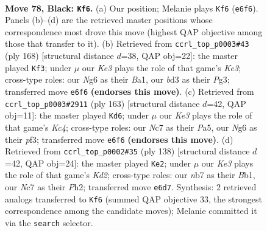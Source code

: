 \documentclass[11pt]{article}
\begin{document}
\clearpage

\begin{figure}[p]\centering
\begin{subfigure}{0.46\textwidth}\centering
\resizebox{\linewidth}{!}{%
\newchessgame
\chessboard[
  setfen={8/1Nn5/4k1n1/p7/Pb1pP3/1P1B3p/4P3/3K4 b - - 23 78},
  showmover=false,
  pgfstyle=straightmove, color=movearrow, markmove={e6-f6}
]}
\caption{}
\end{subfigure}\hfill
\begin{subfigure}{0.46\textwidth}\centering
\resizebox{\linewidth}{!}{%
\newchessgame
\chessboard[
  setfen={6k1/1B3p2/Pb4p1/2p1P2p/2b4P/4K1P1/8/B7 w - - 45 85},
  showmover=false,
  pgfstyle=straightmove, color=movearrow, markmove={e3-f3}
]}
\caption{}
\end{subfigure}
\\[4pt]
\begin{subfigure}{0.46\textwidth}\centering
\resizebox{\linewidth}{!}{%
\newchessgame
\chessboard[
  setfen={8/8/8/p1kPp1p1/7p/1B2PP1P/P3K3/2b5 b - - 81 82},
  showmover=false,
  pgfstyle=straightmove, color=movearrow, markmove={c5-d6}
]}
\caption{}
\end{subfigure}\hfill
\begin{subfigure}{0.46\textwidth}\centering
\resizebox{\linewidth}{!}{%
\newchessgame
\chessboard[
  setfen={R7/8/5k2/2n2p2/3bp1p1/6P1/1p1K1P1P/1B6 w - - 18 70},
  showmover=false,
  pgfstyle=straightmove, color=movearrow, markmove={d2-e2}
]}
\caption{}
\end{subfigure}
\caption{\textbf{Move 78, Black: \texttt{Kf6}.} (a) Our position; Melanie plays \texttt{Kf6} (\texttt{e6f6}). Panels (b)--(d) are the retrieved master positions whose correspondence most drove this move (highest QAP objective among those that transfer to it). (b) Retrieved from \texttt{ccrl\_top\_p0003\#43} (ply 168) [structural distance $d$=38, QAP obj=22]: the master played \texttt{Kf3}; under $\mu$ our \emph{Ke3} plays the role of that game's \emph{Ke3}; cross-type roles: our \emph{N}g6 as their \emph{B}a1, our \emph{b}d3 as their \emph{P}g3; transferred move \texttt{e6f6} \textbf{(endorses this move)}. (c) Retrieved from \texttt{ccrl\_top\_p0003\#2911} (ply 163) [structural distance $d$=42, QAP obj=11]: the master played \texttt{Kd6}; under $\mu$ our \emph{Ke3} plays the role of that game's \emph{Kc4}; cross-type roles: our \emph{N}c7 as their \emph{P}a5, our \emph{N}g6 as their \emph{p}f3; transferred move \texttt{e6f6} \textbf{(endorses this move)}. (d) Retrieved from \texttt{ccrl\_top\_p0002\#35} (ply 138) [structural distance $d$=42, QAP obj=24]: the master played \texttt{Ke2}; under $\mu$ our \emph{Ke3} plays the role of that game's \emph{Kd2}; cross-type roles: our \emph{n}b7 as their \emph{B}b1, our \emph{N}c7 as their \emph{P}h2; transferred move \texttt{e6d7}. Synthesis: 2 retrieved analogs transferred to \texttt{Kf6} (summed QAP objective 33, the strongest correspondence among the candidate moves); Melanie committed it via the \texttt{search} selector.}
\label{fig:thought-m155}
\end{figure}
\end{document}
